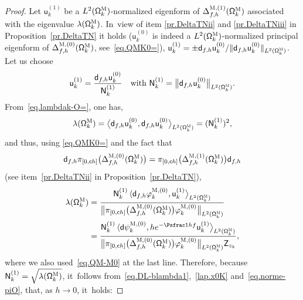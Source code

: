\begin{proof}
Let $\mathsf u^{(1)}_k$ be a $L^2(\mathsf
\Omega_k^{\textsc{M}})$-normalized eigenform of $
\Delta_{f,h}^{\textsc{M},(1)} (\mathsf \Omega_k^{\textsc{M}}) $
associated with the eigenvalue $\lambda(\mathsf
\Omega_k^{\textsc{M}})$. In~view of item \eqref{pr.DeltaTNii} and \eqref{pr.DeltaTNiii} in Proposition~\ref{pr.DeltaTN} it holds ($\mathsf u^{(0)}_k$ is indeed a
$L^2(\mathsf
\Omega_k^{\textsc{M}})$-normalized principal eigenform of $\Delta_{f,h}^{\textsc{M},(0)}
(\mathsf \Omega_k^{\textsc{M}})$, see~\eqref{eq.QMK0=}),
$\mathsf u^{(1)}_k=\pm \mathsf d_{f,h} \mathsf u^{(0)}_k / \Vert \mathsf d_{f,h} \mathsf u^{(0)}_k \Vert_{L^2(\mathsf \Omega_k^{\textsc{M}})}$.
Let us choose
\begin{equation}\label{eq.u1k}
\mathsf u^{(1)}_k=\frac{ \mathsf d_{f,h} \mathsf u^{(0)}_k } { \mathsf N_k^{(1)}} \quad\text{with } \mathsf N_k^{(1)}=\big \Vert \mathsf d_{f,h} \mathsf u^{(0)}_k\big \Vert_{L^2(\mathsf \Omega_k^{\textsc{M}})}.
\end{equation}
From~\eqref{eq.lambdak-O=}, one has,
\[
\lambda(\mathsf
\Omega_k^{\textsc{M}})= \bigl\langle \mathsf d_{f,h} \mathsf u^{(0)}_k, \mathsf d_{f,h} \mathsf u^{(0)}_k \big \rangle_{ L^2(\mathsf
\Omega_k^{\textsc{M}})}=(\mathsf N_k^{(1)})^2,
\]
and thus, using \eqref{eq.QMK0=} and the fact that
\[
\mathsf d_{f,h} \pi_{[0,\mathsf ch ]}\bigl(\Delta_{f,h}^{\textsc{M},(0)} (\mathsf \Omega_k^{\textsc{M}})\bigr)= \pi_{[0,\mathsf ch ]}\bigl(\Delta_{f,h}^{\textsc{M},(1)} (\mathsf \Omega_k^{\textsc{M}})\bigr) \mathsf d_{f,h}
\]
(see item~\eqref{pr.DeltaTNii} in Proposition~\ref{pr.DeltaTN}),
\begin{align*}
\lambda(\mathsf \Omega_k^{\textsc{M}})&=\frac{\mathsf N_k^{(1)} \,\langle \mathsf d_{f,h} \varphi^{\textsc{M},(0)}_k, \mathsf u^{(1)}_k \big \rangle_{ L^2(\mathsf \Omega_k^{\textsc{M}})}}{ \bigl\Vert\pi_{[0,\mathsf ch ]}\bigl(\Delta_{f,h}^{\textsc{M},(0)} (\mathsf \Omega_k^{\textsc{M}})\bigr) \varphi^{\textsc{M},(0)}_k \bigr\Vert_{L^2(\mathsf \Omega_k^{\textsc{M}})} } \\
&=\frac{\mathsf N_k^{(1)} \,\langle \mathsf d \psi^{\textsc{M},(0)}_k, h e^{-\Psfrac 1hf} \mathsf u^{(1)}_k \big \rangle_{ L^2(\mathsf \Omega_k^{\textsc{M}})}}{ \bigl\Vert\pi_{[0,\mathsf ch ]}\bigl(\Delta_{f,h}^{\textsc{M},(0)} (\mathsf \Omega_k^{\textsc{M}})\bigr) \varphi^{\textsc{M},(0)}_k \bigr\Vert_{L^2(\mathsf \Omega_k^{\textsc{M}})} \mathsf Z_{z_k} },
\end{align*}
where we also used~\eqref{eq.QM-M0} at the last line. Therefore, because $\mathsf N_k^{(1)}=\sqrt { \lambda(\mathsf \Omega_k^{\textsc{M}})}$, it~follows from~\eqref{eq.DL-blambda1},~\eqref{lap.x0K} and~\eqref{eq.norme-piO}, that, as $h\to 0$, it~holds:

\end{proof}
